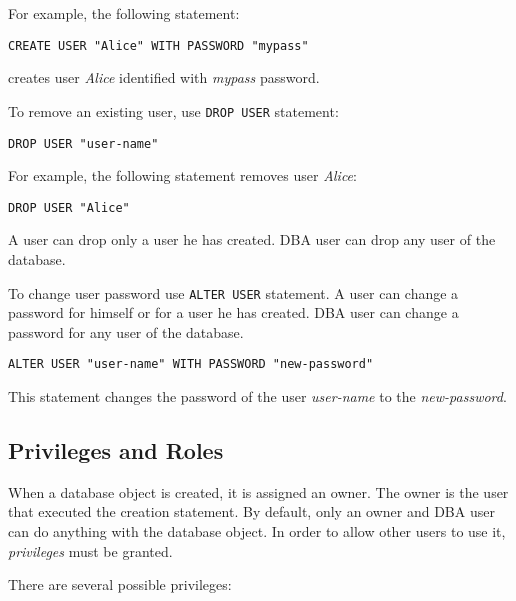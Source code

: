 \documentclass[a4paper,12pt]{article}
\begin{document}
For example, the following statement:

\begin{verbatim}
CREATE USER "Alice" WITH PASSWORD "mypass"
\end{verbatim}

creates user \emph{Alice} identified with \emph{mypass} password.

To remove an existing user, use \verb!DROP USER! statement:

\begin{verbatim}
DROP USER "user-name"
\end{verbatim}

For example, the following statement removes user \emph{Alice}:

\begin{verbatim}
DROP USER "Alice"
\end{verbatim}

A user can drop only a user he has created. DBA user can drop any user of the
database.

To change user password use \verb!ALTER USER! statement. A user can change a
password for himself or for a user he has created. DBA user can change a
password for any user of the database.

\begin{verbatim}
ALTER USER "user-name" WITH PASSWORD "new-password"
\end{verbatim}

This statement changes the password of the user \emph{user-name} to
the \emph{new-password}.


\subsection{Privileges and Roles}
\label{roles}

When a database object is created, it is assigned an owner. The owner is the
user that executed the creation statement. By default, only an owner and DBA
user can do anything with the database object. In order to allow other users
to use it, \emph{privileges} must be granted.

There are several possible privileges:
\end{document}
